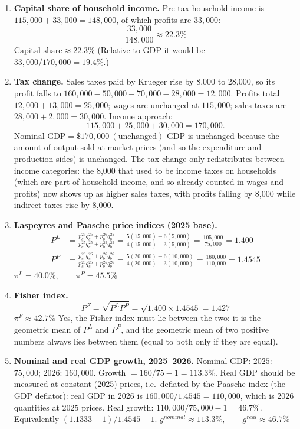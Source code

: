 \documentclass[11pt]{article}
\newcommand{\ans}[1]{$\boxed{#1}$}
\begin{document}
\begin{enumerate}[label=\textbf{\arabic*.}, leftmargin=*]
\ans{\text{Nominal GDP} = \$170{,}000 \text{ (all three approaches)}}

\item \textbf{Capital share of household income.}
Pre-tax household income is $115{,}000 + 33{,}000 = 148{,}000$, of which profits are $33{,}000$:
\[
  \frac{33{,}000}{148{,}000} \approx 22.3\%
\]
\ans{\text{Capital share} \approx 22.3\%}
(Relative to GDP it would be $33{,}000/170{,}000 = 19.4\%$.)

\item \textbf{Tax change.} Sales taxes paid by Krueger rise by 8,000 to 28,000, so its profit falls to $160{,}000-50{,}000-70{,}000-28{,}000 = 12{,}000$. Profits total $12{,}000+13{,}000=25{,}000$; wages are unchanged at $115{,}000$; sales taxes are $28{,}000+2{,}000=30{,}000$. Income approach:
\[
  115{,}000 + 25{,}000 + 30{,}000 = 170{,}000.
\]
\ans{\text{Nominal GDP} = \$170{,}000 \ (\text{unchanged})}
GDP is unchanged because the amount of output sold at market prices (and so the expenditure and production sides) is unchanged. The tax change only redistributes between income categories: the 8,000 that used to be income taxes on households (which are part of household income, and so already counted in wages and profits) now shows up as higher sales taxes, with profits falling by 8,000 while indirect taxes rise by 8,000.

\item \textbf{Laspeyres and Paasche price indices (2025 base).}
\begin{align*}
  P^L &= \frac{p^{26}_c q^{25}_c + p^{26}_b q^{25}_b}{p^{25}_c q^{25}_c + p^{25}_b q^{25}_b}
      = \frac{5(15{,}000)+6(5{,}000)}{4(15{,}000)+3(5{,}000)} = \frac{105{,}000}{75{,}000} = 1.400\\
  P^P &= \frac{p^{26}_c q^{26}_c + p^{26}_b q^{26}_b}{p^{25}_c q^{26}_c + p^{25}_b q^{26}_b}
      = \frac{5(20{,}000)+6(10{,}000)}{4(20{,}000)+3(10{,}000)} = \frac{160{,}000}{110{,}000} = 1.4545
\end{align*}
\ans{\pi^L = 40.0\%, \qquad \pi^P = 45.5\%}

\item \textbf{Fisher index.}
\[
  P^F = \sqrt{P^L P^P} = \sqrt{1.400 \times 1.4545} = 1.427
\]
\ans{\pi^F \approx 42.7\%}
Yes, the Fisher index must lie between the two: it is the geometric mean of $P^L$ and $P^P$, and the geometric mean of two positive numbers always lies between them (equal to both only if they are equal).

\item \textbf{Nominal and real GDP growth, 2025--2026.}
Nominal GDP: $2025$: $75{,}000$; $2026$: $160{,}000$. Growth $=160/75-1 =113.3\%$.
Real GDP should be measured at constant (2025) prices, i.e.\ deflated by the Paasche index (the GDP deflator): real GDP in 2026 is $160{,}000/1.4545 = 110{,}000$, which is $2026$ quantities at 2025 prices. Real growth: $110{,}000/75{,}000-1=46.7\%$. Equivalently $(1.1333+1)/ 1.4545 - 1$.
\ans{g^{nominal} \approx 113.3\%, \qquad g^{real} \approx 46.7\%}

\end{enumerate}
\end{document}

